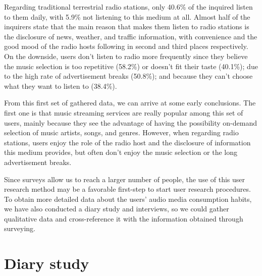 Regarding traditional terrestrial radio stations, only 40.6\% of the inquired listen to them daily, with 5.9\% not listening to this medium at all. Almost half of the inquirers state that the main reason that makes them listen to radio stations is the disclosure of news, weather, and traffic information, with convenience and the good mood of the radio hosts following in second and third places respectively. On the downside, users don't listen to radio more frequently since they believe the music selection is too repetitive (58.2\%) or doesn't fit their taste (40.1\%); due to the high rate of advertisement breaks (50.8\%); and because they can't choose what they want to listen to (38.4\%).

From this first set of gathered data, we can arrive at some early conclusions. The first one is that music streaming services are really popular among this set of users, mainly because they see the advantage of having the possibility on-demand selection of music artists, songs, and genres. However, when regarding radio stations, users enjoy the role of the radio host and the disclosure of information this medium provides, but often don't enjoy the music selection or the long advertisement breaks.

Since surveys allow us to reach a larger number of people, the use of this user research method may be a favorable first-step to start user research procedures. To obtain more detailed data about the users' audio media consumption habits, we have also conducted a diary study and interviews, so we could gather qualitative data and cross-reference it with the information obtained through surveying.

\section{Diary study}

